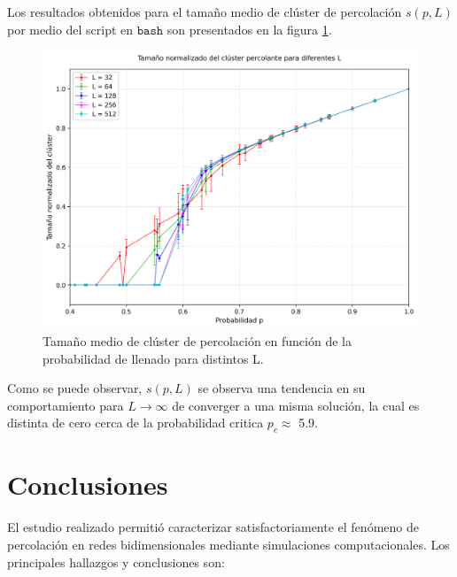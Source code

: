 \documentclass[12pt,a4paper]{article}
\begin{document}
Los resultados obtenidos para el tamaño medio de clúster de percolación $s(p,L)$ por medio del script en $\texttt{bash}$ son presentados en la figura \ref{fig:6}.

\begin{figure}[H]
   \centering
   \includegraphics[width=0.9\linewidth]{../figures/Cluster_all_L.png}
    \caption{Tamaño medio de clúster de percolación en función de la probabilidad de llenado para distintos L.}
    \label{fig:6}
\end{figure}

Como se puede observar, $s(p,L)$ se observa una tendencia en su comportamiento para $L\rightarrow\infty$ de converger a una misma solución, la cual es distinta de cero cerca de la probabilidad critica $p_c\approx$ 5.9. 

\section{Conclusiones}

El estudio realizado permitió caracterizar satisfactoriamente el fenómeno de percolación en redes bidimensionales mediante simulaciones computacionales. Los principales hallazgos y conclusiones son:
\end{document}
